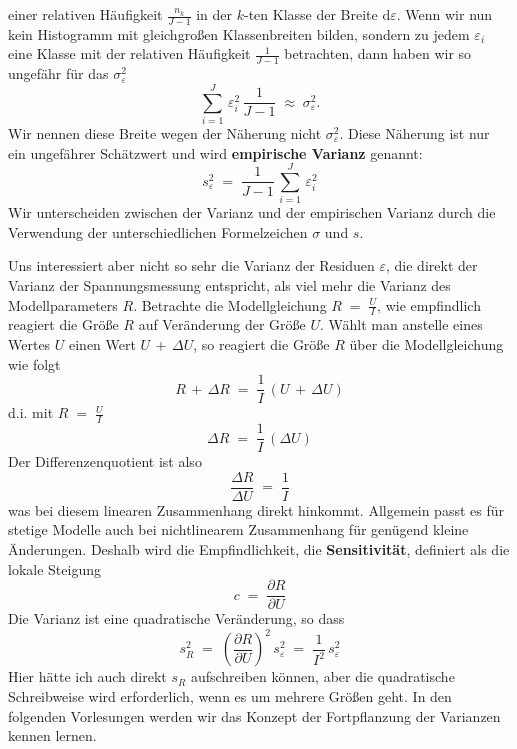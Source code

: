 einer relativen Häufigkeit $\frac{n_k}{J-1}$ in der $k$-ten Klasse der Breite $\mathrm{d} \varepsilon$.
Wenn wir nun kein Histogramm mit gleichgroßen Klassenbreiten bilden, sondern zu jedem $\varepsilon_i$ eine Klasse mit der relativen
Häufigkeit $\frac{1}{J-1}$ betrachten, dann haben wir so ungefähr für das $\sigma_{\varepsilon}^2$
\begin{equation}
\sum_{i=1}^J \, \varepsilon_i^2 \,  \frac{1}{J-1}  \; \approx \; \sigma_{\varepsilon}^2 .
\end{equation}
Wir nennen diese Breite wegen der Näherung nicht $\sigma_{\varepsilon}^2$. Diese Näherung ist nur ein ungefährer Schätzwert 
und wird \textbf{empirische Varianz} genannt:
\begin{equation}
s_{\varepsilon}^2 \; = \; \frac{1}{J-1} \, \sum_{i=1}^J \, \varepsilon_i^2
\end{equation}
Wir unterscheiden zwischen der Varianz und der empirischen Varianz durch die Verwendung der
unterschiedlichen Formelzeichen $\sigma$ und $s$.

Uns interessiert aber nicht so sehr die Varianz der Residuen $\varepsilon$, die direkt der Varianz
der Spannungsmessung entspricht,
als viel mehr die Varianz des Modellparameters $R$.
Betrachte die Modellgleichung $R \; = \; \frac{U}{I}$, wie empfindlich reagiert die Größe $R$ auf Veränderung der Größe $U$.
Wählt man anstelle eines Wertes $U$ einen Wert $U \, + \, \Delta U$, so reagiert die Größe $R$ über die Modellgleichung wie folgt
\begin{equation}
R \, + \, \Delta R \; = \; \frac{1}{I} \, \left( U \, + \, \Delta U \right)
\end{equation}
d.i. mit $R \; = \; \frac{U}{I}$
\begin{equation}
\Delta R \; = \; \frac{1}{I} \, \left( \Delta U \right)
\end{equation}
Der Differenzenquotient ist also
\begin{equation}
\frac{\Delta R}{\Delta U} \; = \; \frac{1}{I}
\end{equation}
was bei diesem linearen Zusammenhang direkt hinkommt. Allgemein passt es für stetige Modelle auch bei nichtlinearem Zusammenhang
für genügend kleine Änderungen. Deshalb wird die Empfindlichkeit, die \textbf{Sensitivität}, definiert als die lokale Steigung
\begin{equation}
c  \; = \; \frac{\partial R}{\partial U}
\end{equation}
Die Varianz ist eine quadratische Veränderung, so dass
\begin{equation}
s_R^2  \; = \; \left(\frac{\partial R}{\partial U}\right)^2 \, s_{\varepsilon}^2 \; = \; \frac{1}{I^2} \, s_{\varepsilon}^2
\end{equation}
Hier hätte ich auch direkt $s_R$ aufschreiben können, aber die quadratische Schreibweise wird erforderlich, wenn es um mehrere Größen geht. In den folgenden Vorlesungen werden wir das Konzept der Fortpflanzung der Varianzen kennen lernen.

